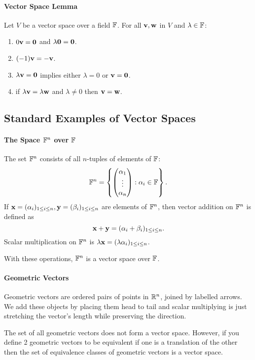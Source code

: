 \paragraph{Vector Space Lemma}
Let \(V\) be a vector space over a field \(\mathbb{F}\). For all \(\mathbf{v}, \mathbf{w}\) in \(V\) and \(\lambda \in \mathbb{F}\):
\begin{enumerate}
    \item \(0\mathbf{v} = \mathbf{0}\) and \(\lambda\mathbf{0} = \mathbf{0}\).
    \item \((-1)\mathbf{v} = -\mathbf{v}\).
    \item \(\lambda\mathbf{v} = \mathbf{0}\) implies either \(\lambda = 0\) or \(\mathbf{v} = \mathbf{0}\).
    \item if \(\lambda\mathbf{v} = \lambda\mathbf{w}\) and \(\lambda \neq 0\) then \(\mathbf{v} = \mathbf{w}\).
\end{enumerate}

\subsection{Standard Examples of Vector Spaces}
\paragraph{The Space \(\mathbb{F}^n\) over \(\mathbb{F}\)}
The set \(\mathbb{F}^n\) consists of all \(n\)-tuples of elements of \(\mathbb{F}\):
\[\mathbb{F}^n = \left\{ \begin{pmatrix}
    \alpha_1 \\ \vdots \\ \alpha_n
\end{pmatrix}: \alpha_i \in \mathbb{F} \right\}.\]
If \(\mathbf{x} = (\alpha_i)_{1 \leq i \leq n}, \mathbf{y} = (\beta_i)_{1 \leq i \leq n}\) are elements of \(\mathbb{F}^n\), then vector addition on \(\mathbb{F}^n\) is defined as 
\[\mathbf{x} + \mathbf{y} = (\alpha_i + \beta_i)_{1 \leq i \leq n}.\]
Scalar multiplication on \(\mathbb{F}^n\) is \(\lambda\mathbf{x} = (\lambda\alpha_i)_{1 \leq i \leq n}\).

With these operations, \(\mathbb{F}^n\) is a vector space over \(\mathbb{F}\).

\paragraph{Geometric Vectors}
Geometric vectors are ordered pairs of points in \(\mathbb{R}^n\), joined by labelled arrows. We add these objects by placing them head to tail and scalar multiplying is just stretching the vector's length while preserving the direction.

The set of all geometric vectors does not form a vector space. However, if you define 2 geometric vectors to be equivalent if one is a translation of the other then the set of equivalence classes of geometric vectors is a vector space.

